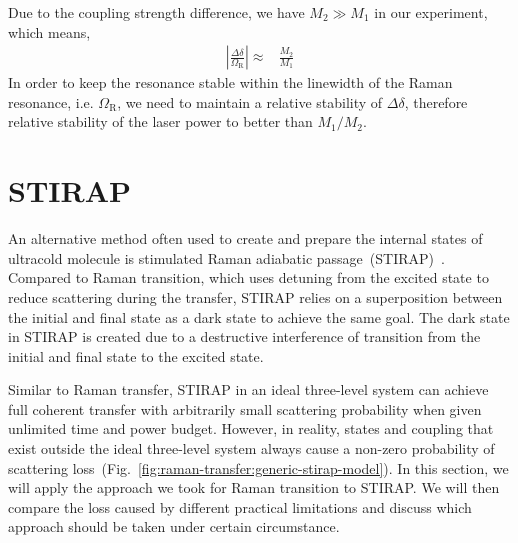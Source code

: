Due to the coupling strength difference, we have $M_2\gg M_1$ in our experiment, which means,
\begin{align*}
  \left|\frac{\Delta\delta}{\Omega_{\mathrm{R}}}\right|\approx&\frac{M_2}{M_1}
\end{align*}
In order to keep the resonance stable within the linewidth of the Raman resonance,
i.e. $\Omega_{\mathrm{R}}$, we need to maintain a relative stability of $\Delta\delta$,
therefore relative stability of the laser power to better than $M_1/M_2$.

\section{STIRAP}
\label{ch:raman-transfer:stirap}

An alternative method often used to create and prepare the internal states of ultracold molecule
is stimulated Raman adiabatic passage~(STIRAP)~\cite{vitanov_coherent_2001}.
Compared to Raman transition, which uses detuning from the excited state
to reduce scattering during the transfer, STIRAP relies on a superposition between
the initial and final state as a dark state to achieve the same goal.
The dark state in STIRAP is created due to a destructive interference of transition
from the initial and final state to the excited state.

Similar to Raman transfer, STIRAP in an ideal three-level system can achieve
full coherent transfer with arbitrarily small scattering probability
when given unlimited time and power budget.
However, in reality, states and coupling that exist outside the ideal three-level system
always cause a non-zero probability of
scattering loss~(Fig.~\ref{fig:raman-transfer:generic-stirap-model}).
In this section, we will apply the approach we took for Raman transition to STIRAP.
We will then compare the loss caused by different practical limitations
and discuss which approach should be taken under certain circumstance.


